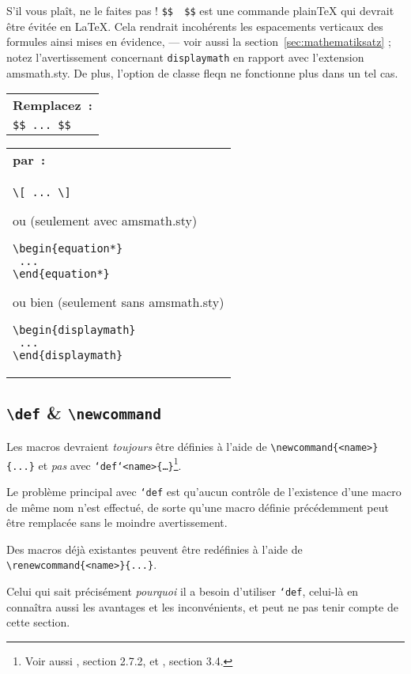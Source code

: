\documentclass[fontsize=11pt, paper=a4, pagesize, captions=tableheading, numbers=enddot, toc=graduated, footnotes=multiple]{scrartcl}%
\makeatletter
\DeclareRobustCommand*{\Macro}[1]{\mbox{\texttt{\char`\\#1}}}
\DeclareRobustCommand*{\LMacro}[2]{\mbox{\texttt{\char`\\#1\{#2\}}}}
\newcommand{\Paket}[1]{\textsf{#1.sty}\xspace}
\newcommand{\Option}[1]{\textsf{#1}\xspace}
\newcommand{\TB}{\textbackslash}
\newenvironment{Ers}[1][\linewidth]{%
  \par\bigskip\noindent\marginline{\textcolor{gruen}{\boldmath $\triangleright$}}\begin{tabular}[t]{@{}p{0.5\textwidth}@{}}\textcolor{rot}{\textbf{\textsf{Remplacez~:}}%
}\\[2pt] \rahmenpr[#1]}%
{\endrahmenpr\end{tabular}}
\newenvironment{Dur}[1][0.5\textwidth]{%
\noindent\begin{tabular}[t]{@{}p{0.5\textwidth - 0.5em}@{}}\textcolor{gruen}{\textbf{\textsf{par~:}}}\\[2pt]\rahmenpg[#1]}%
{\endrahmenpg\end{tabular}\smallskip\noindent}
\makeatother
\begin{document}
S'il vous plaît, ne le faites pas ! \texttt{\$\$\,\textellipsis\,\$\$} est une commande plain\TeX{} qui devrait être évitée en \LaTeX. Cela rendrait incohérents les espacements verticaux des formules ainsi mises en évidence, — voir aussi la section~\vref{sec:mathematiksatz} ; notez l'avertissement concernant \texttt{displaymath} en rapport avec l'extension \Paket{amsmath}. De plus, l'option de classe \Option{fleqn} ne fonctionne plus dans un tel cas.

\begin{Ers}
\verb|$$ ... $$|
\end{Ers}
\begin{Dur}
\begin{verbatim}
\[ ... \]
\end{verbatim}
  ou (seulement avec \Paket{amsmath})
\begin{verbatim}
\begin{equation*}
 ...
\end{equation*}
\end{verbatim}
ou bien (seulement sans \Paket{amsmath})
\begin{verbatim}
\begin{displaymath}
 ...
\end{displaymath}
\end{verbatim}
\end{Dur}

\subsection{\texttt{\TB def} \& \texttt{\TB newcommand}}
\label{sec:def-vs.-newcommand}

Les macros devraient \emph{toujours} être définies à l'aide de \verb+\newcommand{<name>}{...}+ et \emph{pas} avec \Macro{def}\LMacro{<name>}{…}\footnote{Voir aussi \cite{clsguide-06}, section 2.7.2, et \cite{usrguide-05}, section 3.4.}.

Le problème principal avec \Macro{def} est qu'aucun contrôle de l'existence d'une macro de même nom n'est effectué, de sorte qu’une macro définie précédemment peut être remplacée sans le moindre avertissement.

Des macros déjà existantes peuvent être redéfinies à l'aide de \\
\verb+\renewcommand{<name>}{...}+.

Celui qui sait précisément \emph{pourquoi} il a besoin d'utiliser \Macro{def}, celui-là en connaîtra aussi les avantages et les inconvénients, et peut ne pas tenir compte de cette section.
\end{document}
